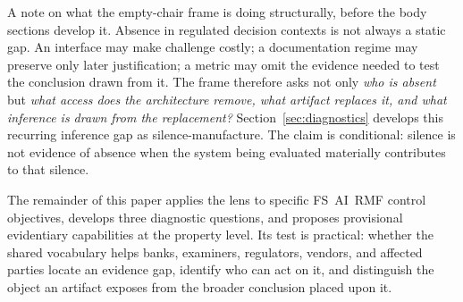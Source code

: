 A note on what the empty-chair frame is doing structurally, before the body sections develop it. Absence in regulated decision contexts is not always a static gap. An interface may make challenge costly; a documentation regime may preserve only later justification; a metric may omit the evidence needed to test the conclusion drawn from it. The frame therefore asks not only \emph{who is absent} but \emph{what access does the architecture remove, what artifact replaces it, and what inference is drawn from the replacement?} Section~\ref{sec:diagnostics} develops this recurring inference gap as silence-manufacture. The claim is conditional: silence is not evidence of absence when the system being evaluated materially contributes to that silence.

The remainder of this paper applies the lens to specific FS~AI~RMF control objectives, develops three diagnostic questions, and proposes provisional evidentiary capabilities at the property level. Its test is practical: whether the shared vocabulary helps banks, examiners, regulators, vendors, and affected parties locate an evidence gap, identify who can act on it, and distinguish the object an artifact exposes from the broader conclusion placed upon it.
